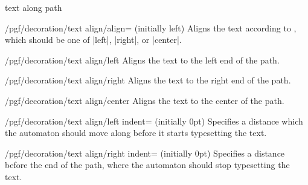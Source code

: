 \begin{decoration}{text along path}
    \begin{key}{/pgf/decoration/text align/align= (initially left)}
        Aligns the text according to , which should be one of
        |left|, |right|, or |center|.
\begin{codeexample}[preamble={\usetikzlibrary{decorations.text}}]
\end{codeexample}
    \end{key}

    \begin{stylekey}{/pgf/decoration/text align/left}
        Aligns the text to the left end of the path.
    \end{stylekey}

    \begin{stylekey}{/pgf/decoration/text align/right}
        Aligns the text to the right end of the path.
    \end{stylekey}

    \begin{stylekey}{/pgf/decoration/text align/center}
        Aligns the text to the center of the path.
    \end{stylekey}

    \begin{key}{/pgf/decoration/text align/left indent= (initially 0pt)}
        Specifies a distance which the automaton should move along before it
        starts typesetting the text.
    \end{key}

    \begin{key}{/pgf/decoration/text align/right indent= (initially 0pt)}
        Specifies a distance before the end of the path, where the automaton
        should stop typesetting the text.
    \end{key}


\end{decoration}
